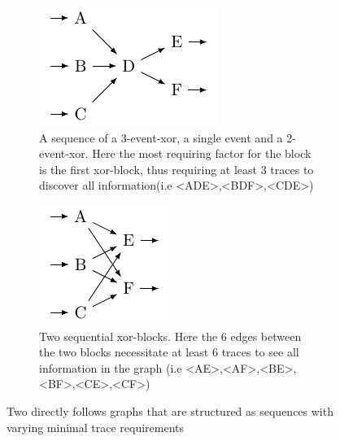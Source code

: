 \documentclass[
	a4paper,
	pagesize,
	pdftex,
	12pt,
	twoside, %
	BCOR=5mm, %
	ngerman,
	fleqn,
	final,
	]{scrartcl}
\begin{document}
\begin{figure}[h]
	\begin{subfigure}[t]{.5\textwidth}
	  \centering
	  \includegraphics[width=.55\linewidth]{img/sequence_xor_event_xor.pdf}
	  \caption{A sequence of a 3-event-xor, a single event and a 2-event-xor. Here the most requiring factor for the block is the first xor-block, thus requiring at least 3 traces to discover all information(i.e <ADE>,<BDF>,<CDE>)}
	  \label{fig:sequenceXorEventXor}
	\end{subfigure}
	\begin{subfigure}[t]{.5\textwidth}
	  \centering
	  \includegraphics[width=.4\linewidth]{img/sequence_xor_xor.pdf}
	  \caption{Two sequential xor-blocks. Here the 6 edges between the two blocks necessitate at least 6 traces to see all information in the graph (i.e <AE>,<AF>,<BE>,<BF>,<CE>,<CF>)}
	  	  \label{fig:sequenceXorXor}
	\end{subfigure}
	\caption{Two directly follows graphs that are structured as sequences with varying minimal trace requirements}
	\label{fig:sequenceTraces}
\end{figure}
\end{document}
